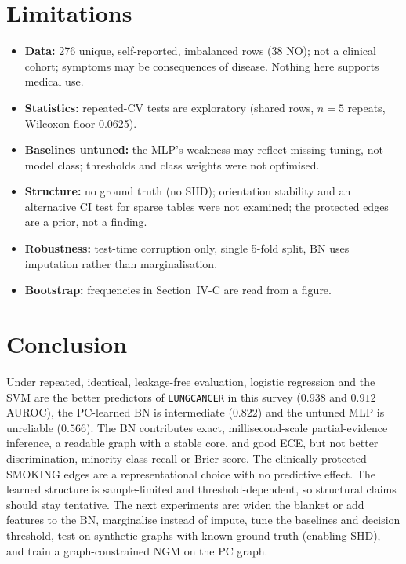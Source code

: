 \documentclass[10pt,twocolumn,letterpaper]{article}
\renewcommand{\_}{\textunderscore\hspace{0pt}}
\newcommand{\V}[1]{{\texttt{\footnotesize #1}}}
\begin{document}
\section{Limitations}
\begin{itemize}
\item \textbf{Data:} 276 unique, self-reported, imbalanced rows (38 NO); not a clinical cohort; symptoms may be consequences of disease. Nothing here supports medical use.
\item \textbf{Statistics:} repeated-CV tests are exploratory (shared rows, $n=5$ repeats, Wilcoxon floor 0.0625).
\item \textbf{Baselines untuned:} the MLP's weakness may reflect missing tuning, not model class; thresholds and class weights were not optimised.
\item \textbf{Structure:} no ground truth (no SHD); orientation stability and an alternative CI test for sparse tables were not examined; the protected edges are a prior, not a finding.
\item \textbf{Robustness:} test-time corruption only, single 5-fold split, BN uses imputation rather than marginalisation.
\item \textbf{Bootstrap:} frequencies in Section~IV-C are read from a figure.
\end{itemize}

\section{Conclusion}
Under repeated, identical, leakage-free evaluation, logistic regression and the SVM are the better predictors of \V{LUNG\_CANCER} in this survey ($0.938$ and $0.912$ AUROC), the PC-learned BN is intermediate ($0.822$) and the untuned MLP is unreliable ($0.566$). The BN contributes exact, millisecond-scale partial-evidence inference, a readable graph with a stable core, and good ECE, but not better discrimination, minority-class recall or Brier score. The clinically protected SMOKING edges are a representational choice with no predictive effect. The learned structure is sample-limited and threshold-dependent, so structural claims should stay tentative. The next experiments are: widen the blanket or add features to the BN, marginalise instead of impute, tune the baselines and decision threshold, test on synthetic graphs with known ground truth (enabling SHD), and train a graph-constrained NGM on the PC graph.
\end{document}

